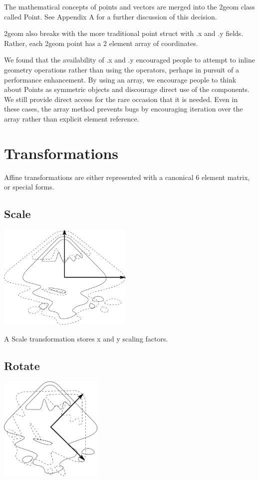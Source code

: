 \documentclass[openany]{book}
\newcommand{\code}[1]{\textsf{#1}}
\begin{document}
The mathematical concepts of points and vectors are merged into the
2geom class called \code{Point}.  See Appendix A for a further
discussion of this decision.

2geom also breaks with the more traditional point \code{struct} with
\code{.x} and \code{.y} fields.  Rather, each 2geom point has a 2
element array of coordinates.

We found that the availability of \code{.x} and \code{.y} encouraged
people to attempt to inline geometry operations rather than using the
operators, perhaps in pursuit of a performance enhancement.  By using
an array, we encourage people to think about \code{Point}s as
symmetric objects and discourage direct use of the components.  We
still provide direct access for the rare occasion that it is needed.
Even in these cases, the array method prevents bugs by encouraging
iteration over the array rather than explicit element reference.

\section{Transformations}

Affine transformations are either represented with a canonical 6
element matrix, or special forms.

\subsection{Scale}

\includegraphics[height=50mm]{media/scale.png}

A \code{Scale} transformation stores x and y scaling factors.

\subsection{Rotate}

\includegraphics[height=50mm]{media/rotate.png}
\end{document}
